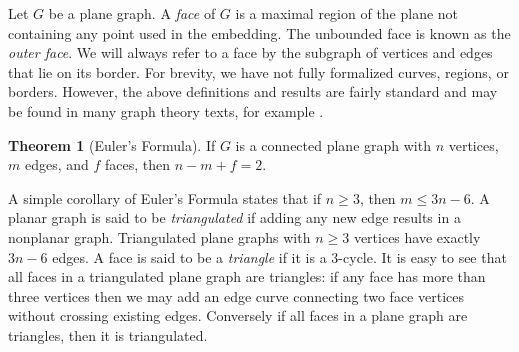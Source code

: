 \documentclass[letterpaper, 12pt]{amsart}
\theoremstyle{definition}
\theoremstyle{definition}
\theoremstyle{thm}
\newtheorem{theorem}{Theorem}[section]
\theoremstyle{definition}
\begin{document}
Let $G$ be a plane graph. A \textit{face} of $G$ is a maximal region
of the plane not containing any point used in the embedding. The unbounded face
is known as the \textit{outer face}. We will always refer to a face by the
subgraph of vertices and edges that lie on its border. For brevity, we have
not fully formalized curves, regions, or borders. However, the
above definitions and results are fairly standard and may be found in many graph
theory texts, for example \cite{west}.

\begin{theorem}[Euler's Formula]
If $G$ is a connected plane graph with $n$ vertices, $m$ edges, and $f$ faces,
then $n-m+f=2$.
\end{theorem}

A simple corollary of Euler's Formula states that if $n\ge 3$, then $m\le 3n-6$.
A planar graph is said to be \textit{triangulated} if adding any new edge
results in a nonplanar graph. Triangulated plane graphs with $n\ge 3$ vertices
have exactly $3n-6$ edges. A face is said to be a \textit{triangle} if it is a
$3$-cycle. It is easy to see that all faces in a triangulated
plane graph are triangles: if any face has more than three vertices then we may
add an edge curve connecting two face vertices without crossing existing edges.
Conversely if all faces in a plane graph are triangles, then it is triangulated.

\begin{comment}
\begin{figure}
\begin{tikzpicture}
	\node (a) at (0.75cm,0.75cm) {};
	\node (b) at (0.75cm,-0.75cm) {};
	\node (c) at (-0.75cm,-0.75cm) {};
	\node (d) at (-0.75cm,0.75cm) {};
	\node [draw=none, fill=none] (1) at (0cm,-1cm) {};
	\node [draw=none, fill=none] (2) at (0cm,1cm) {};
	\draw (a) -- (b) -- (c) -- (d) -- (a);
	\draw (a) -- (c); \draw (b) -- (d);
\end{tikzpicture}
$\qquad$
\begin{tikzpicture}
	\node (a) at (0cm,0.75cm) {};
	\node (b) at (0.866cm,-0.75cm) {};
	\node (c) at (-0.866cm,-0.75cm) {};
	\node (d) at (0cm, -0.18cm) {};
	\node [draw=none, fill=none] (1) at (0cm,-1cm) {};
	\node [draw=none, fill=none] (2) at (0cm,1cm) {};
	\draw (a) -- (b) -- (c) -- (d) -- (a);
	\draw (a) -- (c); \draw (b) -- (d);
\end{tikzpicture}

\caption{A nonplanar drawing and a planar embedding of $K_4$.}
\end{figure}
\end{comment}
\end{document}
